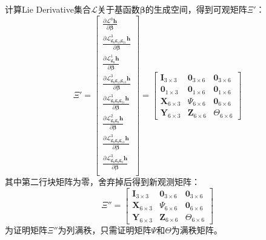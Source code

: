\documentclass{article}
\begin{document}
\par
计算Lie Derivative集合$\mathcal{L}$关于基函数$\mathbf{\beta}$的生成空间，得到可观矩阵$\Xi'$：
\begin{equation}
    \Xi'=\left[\begin{array}{c}
    \frac{\partial{\mathcal{L}^{0}}\textbf{h}}{\partial{\mathbf{\beta}}}\\
    \frac{\partial{\mathcal{L}^{3}_{\textbf{g}_{0}\textbf{g}_{13}\textbf{g}_{21}}\textbf{h}}}{\partial{\mathbf{\beta}}}\\
    \frac{\partial{\mathcal{L}^{1}_{\textbf{g}_0}}\textbf{h}}{\partial{\mathbf{\beta}}}\\
    \frac{\partial{\mathcal{L}^{3}_{\textbf{g}_{0}\textbf{g}_{13}\textbf{g}_{13}}\textbf{h}}}{\partial{\mathbf{\beta}}}\\
    \frac{\partial{\mathcal{L}^{3}_{\textbf{g}_{0}\textbf{g}_{0}\textbf{g}_{21}}\textbf{h}}}{\partial{\mathbf{\beta}}}\\
    \frac{\partial{\mathcal{L}^{2}_{\textbf{g}_{0}\textbf{g}_{0}}\textbf{h}}}{\partial{\mathbf{\beta}}}\\
    \frac{\partial{\mathcal{L}^{3}_{\textbf{g}_{0}\textbf{g}_{0}\textbf{g}_{13}}\textbf{h}}}{\partial{\mathbf{\beta}}}\\
    \frac{\partial{\mathcal{L}^{3}_{\textbf{g}_{0}\textbf{g}_{0}\textbf{g}_{0}}\textbf{h}}}{\partial{\mathbf{\beta}}}\\
    \end{array}\right]
    =\left[\begin{array}{ccc} \textbf{I}_{3\times 3}& \textbf{0}_{3\times 6}& \textbf{0}_{3\times 6}\\
    \textbf{0}_{1\times 3}& \textbf{0}_{1\times 6}& \textbf{0}_{1\times 6}\\
    \textbf{X}_{6\times 3}& {\Psi}_{6\times 6}& \textbf{0}_{6\times 6}\\
    \textbf{Y}_{6\times 3}& \mathbf{Z}_{6\times 6}& {\Theta}_{6\times 6}
    \end{array}\right]
\end{equation}
其中第二行块矩阵为零，舍弃掉后得到新观测矩阵：
\begin{equation}
    \Xi''=\left[\begin{array}{ccc} \textbf{I}_{3\times 3}& \textbf{0}_{3\times 6}& \textbf{0}_{3\times 6}\\
        \textbf{X}_{6\times 3}& {\Psi}_{6\times 6}& \textbf{0}_{6\times 6}\\
        \textbf{Y}_{6\times 3}& \mathbf{Z}_{6\times 6}& {\Theta}_{6\times 6}
        \end{array}\right]
\end{equation}
为证明矩阵$\Xi''$为列满秩，只需证明矩阵$\Psi$和$\Theta$为满秩矩阵。
\end{document}
